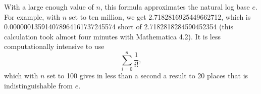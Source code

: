 \documentclass[12pt]{article}
\begin{document}
With a large enough value of $n$, this formula approximates the natural log base $e$. For example, with $n$ set to ten million, we get 2.7182816925449662712, which is 0.000000135914078964161737245574 short of 2.7182818284590452354 (this calculation took almost four minutes with Mathematica 4.2). It is less computationally intensive to use $$\sum_{i = 0}^n \frac{1}{i!},$$ which with $n$ set to 100 gives in less than a second a result to 20 places that is indistinguishable from $e$.
\end{document}
